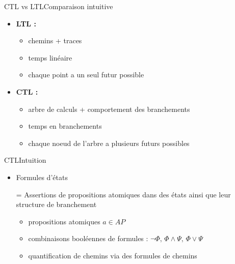 \documentclass[compress]{beamer}
\begin{document}
\begin{frame}{CTL vs LTL}{Comparaison intuitive}
  \begin{itemize}
    \item \textbf{\color{fibeamer@orange}LTL : }
    \begin{itemize}
      \item chemins + traces
      \item temps linéaire
      \item chaque point a un seul futur possible
    \end{itemize}
    \item \textbf{\color{fibeamer@orange}CTL : }
    \begin{itemize}
      \item arbre de calculs + comportement des branchements
      \item temps en branchements
      \item chaque noeud de l'arbre a plusieurs futurs possibles
    \end{itemize}
  \end{itemize}
\end{frame}

\begin{frame}{CTL}{Intuition}
\begin{itemize}
  \item Formules d'états
  \item[=] Assertions de propositions atomiques dans des états ainsi que leur structure de branchement
  \begin{itemize}
    \item propositions atomiques $a \in AP$
    \item combinaisons booléennes de formules :
      $\neg \Phi, \, \Phi \wedge \Psi, \, \Phi \vee \Psi$
    \item quantification de chemins via des {\color{fibeamer@orange} formules de chemins}
  \end{itemize}
\end{itemize}
\end{frame}
\end{document}

